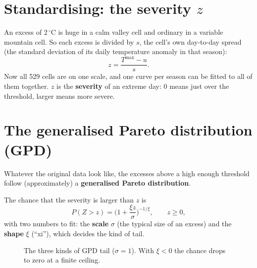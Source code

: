 \section{Standardising: the severity $z$}
An excess of 2\,$^\circ$C is huge in a calm valley cell and ordinary in a variable mountain cell. So each excess is
divided by $s$, the cell's own day-to-day spread (the standard deviation of its daily temperature anomaly in that
season):
\[
  z=\frac{T^{\max}-u}{s}.
\]
Now all 529 cells are on one scale, and one curve per season can be fitted to all of them together. $z$ is the
\textbf{severity} of an extreme day: 0 means just over the threshold, larger means more severe.

\section{The generalised Pareto distribution (GPD)}
\begin{keyidea}
Whatever the original data look like, the excesses above a high enough threshold follow (approximately) a
\textbf{generalised Pareto distribution}.
\end{keyidea}

The chance that the severity is larger than $z$ is
\[
  P(Z>z)=\Big(1+\frac{\xi z}{\sigma}\Big)^{-1/\xi},\qquad z\ge0,
\]
with two numbers to fit: the \textbf{scale} $\sigma$ (the typical size of an excess) and the \textbf{shape} $\xi$
(``xi''), which decides the kind of tail.

\begin{figure}[H]
\centering
{}
\caption{The three kinds of GPD tail ($\sigma=1$). With $\xi<0$ the chance drops to zero at a finite ceiling.}
\end{figure}

